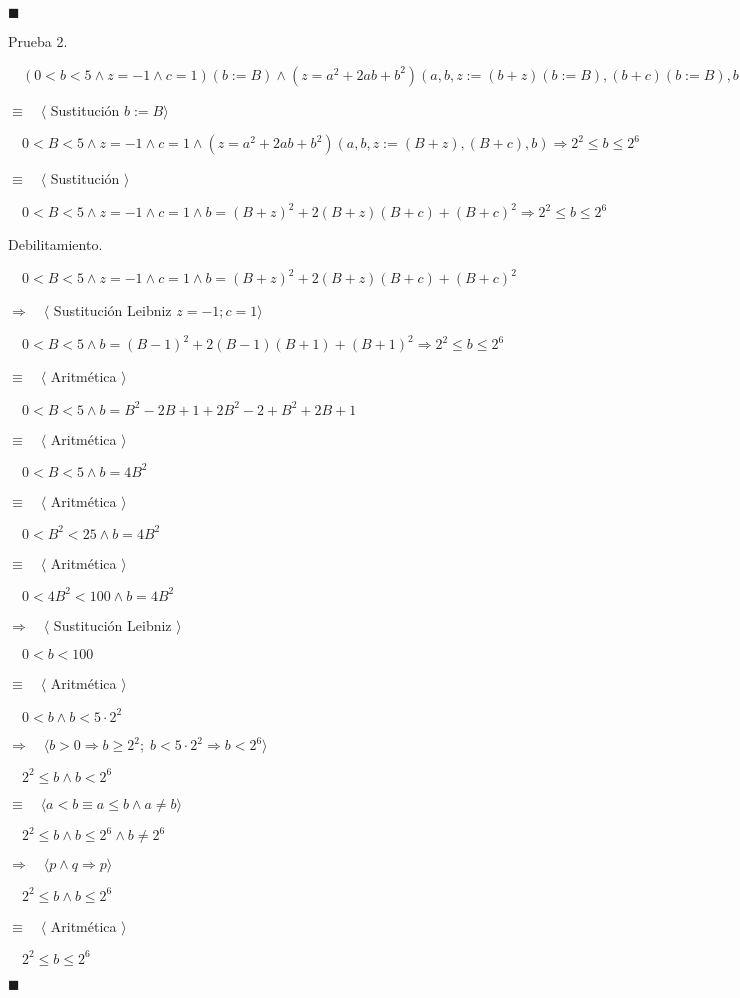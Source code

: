 \documentclass[hidelinks]{article}
\begin{document}
$\blacksquare$ \par
Prueba 2. \par
$\quad (0 < b < 5 \land z = -1 \land c = 1)(b := B) \land (z = a^2 + 2ab +b^2)(a,b,z := (b+z)(b := B), (b+c)(b := B), b) \Rightarrow 2^2 \leq b \leq 2^6$ \par
$\equiv \quad \langle$ Sustitución $ b := B\rangle$ \par
$\quad 0 < B < 5 \land z = -1 \land c = 1 \land (z = a^2 + 2ab +b^2)(a,b,z := (B+z), (B+c), b) \Rightarrow 2^2 \leq b \leq 2^6$ \par
$\equiv \quad \langle$ Sustitución $ \rangle$ \par
$\quad 0 < B < 5 \land z = -1 \land c = 1 \land b = (B+z)^2 + 2(B+z)(B+c) +(B+c)^2 \Rightarrow 2^2 \leq b \leq 2^6$ \par

Debilitamiento. \par
$\quad 0 < B < 5 \land z = -1 \land c = 1 \land b = (B+z)^2 + 2(B+z)(B+c) +(B+c)^2$ \par
$\Rightarrow \quad \langle$ Sustitución Leibniz $ z = -1; c = 1 \rangle$ \par
$\quad 0 < B < 5 \land b = (B-1)^2 + 2(B-1)(B+1) +(B+1)^2 \Rightarrow 2^2 \leq b \leq 2^6$ \par
$\equiv \quad \langle$ Aritmética $ \rangle$ \par
$\quad 0 < B < 5 \land b = B^2 -2B + 1 + 2B^2 - 2 + B^2 +2B + 1 $ \par
$\equiv \quad \langle$ Aritmética $ \rangle$ \par
$\quad 0 < B < 5 \land b = 4B^2$ \par
$\equiv \quad \langle$ Aritmética $ \rangle$ \par
$\quad 0 < B^2 < 25 \land b = 4B^2$ \par
$\equiv \quad \langle$ Aritmética $ \rangle$ \par
$\quad 0 < 4B^2 < 100 \land b = 4B^2$ \par
$\Rightarrow \quad \langle$ Sustitución Leibniz $ \rangle$ \par
$\quad 0 < b < 100 $ \par
$\equiv \quad \langle$ Aritmética $ \rangle$ \par
$\quad 0 < b \land b < 5 \cdot 2^2 $ \par
$\Rightarrow \quad \langle b > 0 \Rightarrow b \geq 2^2; \; b < 5\cdot 2^2 \Rightarrow b < 2^6 \rangle$ \par
$\quad 2^2 \leq b \land b < 2^6 $ \par
$\equiv \quad \langle a < b \equiv a \leq b \land a \neq b \rangle$ \par
$\quad 2^2 \leq b \land b \leq 2^6 \land b \neq 2^6 $ \par
$\Rightarrow \quad \langle p \land q \Rightarrow p \rangle$ \par
$\quad 2^2 \leq b \land b \leq 2^6 $ \par
$\equiv \quad \langle$ Aritmética $ \rangle$ \par
$\quad 2^2 \leq b \leq 2^6 $ \par
$\blacksquare$ \par
\end{document}
